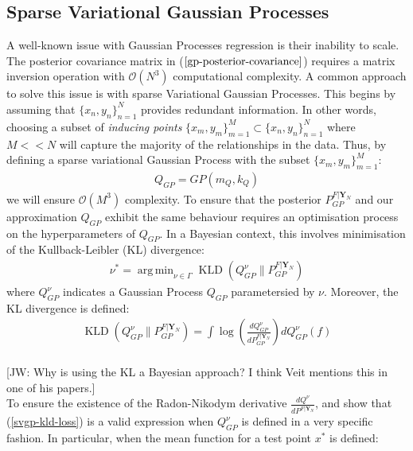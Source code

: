 \documentclass[twoside,11pt]{article}
\newcommand{\jw}[1]{{\color{gray} [JW: #1]}}
\newcommand{\KLD}{\operatorname{KLD}}
\DeclareMathOperator*{\argmin}{arg\,min}
\begin{document}
\subsection{Sparse Variational Gaussian Processes \cite{wild2023connections}}
A well-known issue with Gaussian Processes regression is their inability to scale. The posterior covariance matrix in ($\ref{gp-posterior-covariance}$) requires a matrix inversion operation with $\mathcal{O}(N^3)$ computational complexity. A common approach to solve this issue is with sparse Variational Gaussian Processes. This begins by assuming that $\{x_n, y_n\}_{n=1}^{N}$ provides redundant information. In other words, choosing a subset of \textit{inducing points} $\{x_m, y_m\}_{m=1}^{M} \subset \{x_n, y_n\}_{n=1}^{N}$ where $M << N$ will capture the majority of the relationships in the data. Thus, by defining a sparse variational Gaussian Process with the subset $\{x_m, y_m\}_{m=1}^{M}$:
\begin{align}
    Q_{GP} = GP(m_Q, k_Q)
    \label{svgp}
\end{align}
we will ensure $\mathcal{O}(M^3)$ complexity.
To ensure that the posterior $P_{GP}^{F|\mathbf{Y}_N}$ and our approximation $Q_{GP}$ exhibit the same behaviour requires an optimisation process on the hyperparameters of $Q_{GP}$. In a Bayesian context, this involves minimisation of the Kullback-Leibler (KL) divergence:
\begin{align}
    \nu^* = \argmin_{\nu \in \Gamma} \KLD\left(Q_{GP}^{\nu} \Big\| P_{GP}^{F \vert \mathbf{Y}_N} \right)
    \label{svgp-minimiser}
\end{align}
where $Q_{GP}^{\nu}$ indicates a Gaussian Process $Q_{GP}$ parametersied by $\nu$. Moreover, the KL divergence is defined:
\begin{align}
    \KLD\left(Q_{GP}^{\nu} \Big\| P_{GP}^{F \vert \mathbf{Y}_N} \right) = \int \log \left( \frac{dQ_{GP}^{\nu}}{d P_{GP}^{F \vert \mathbf{Y}_N}} \right) d Q_{GP}^{\nu}(f)
    \label{svgp-kld-loss}
\end{align}
\\\jw{Why is using the KL a Bayesian approach? I think Veit mentions this in one of his papers.}
\\To ensure the existence of the Radon-Nikodym derivative $\frac{dQ^{\nu}}{d P^{F \vert \mathbf{Y}_N}}$, \cite{matthews2016sparse} and \cite{titsias2009variational} show that (\ref{svgp-kld-loss}) is a valid expression when $Q_{GP}^{\nu}$ is defined in a very specific fashion. In particular, when the mean function for a test point $x^*$ is defined:
\end{document}
